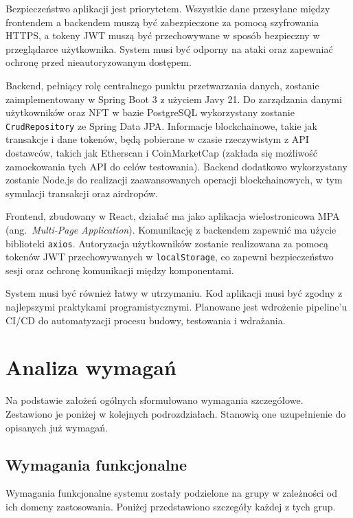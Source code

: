 Bezpieczeństwo aplikacji jest priorytetem. Wszystkie dane przesyłane między frontendem a backendem muszą być zabezpieczone za pomocą szyfrowania HTTPS, a tokeny JWT muszą być przechowywane w sposób bezpieczny w przeglądarce użytkownika. System musi być odporny na ataki oraz zapewniać ochronę przed nieautoryzowanym dostępem.

Backend, pełniący rolę centralnego punktu przetwarzania danych, zostanie zaimplementowany w Spring Boot 3 z użyciem Javy 21. Do zarządzania danymi użytkowników oraz NFT w bazie PostgreSQL wykorzystany zostanie \texttt{CrudRepository} ze Spring Data JPA. Informacje blockchainowe, takie jak transakcje i dane tokenów, będą pobierane w czasie rzeczywistym z API dostawców, takich jak Etherscan i CoinMarketCap (zakłada się możliwość zamockowania tych API do celów testowania). Backend dodatkowo wykorzystany zostanie Node.js do realizacji zaawansowanych operacji blockchainowych, w tym symulacji transakcji oraz airdropów.

Frontend, zbudowany w React, działać ma jako aplikacja wielostronicowa MPA (ang.~\emph{Multi-Page Application}). Komunikację z backendem zapewnić ma użycie biblioteki \texttt{axios}. Autoryzacja użytkowników zostanie realizowana za pomocą tokenów JWT przechowywanych w \texttt{localStorage}, co zapewni bezpieczeństwo sesji oraz ochronę komunikacji między komponentami.

System musi być również łatwy w utrzymaniu. Kod aplikacji musi być zgodny z najlepszymi praktykami programistycznymi. Planowane jest wdrożenie pipeline’u CI/CD do automatyzacji procesu budowy, testowania i wdrażania.




\section{Analiza wymagań}
Na podstawie założeń ogólnych sformułowano wymagania szczegółowe. Zestawiono je poniżej w kolejnych podrozdziałach. Stanowią one uzupełnienie do opisanych już wymagań. 
\subsection{Wymagania funkcjonalne}
Wymagania funkcjonalne systemu zostały podzielone na grupy w zależności od ich domeny zastosowania. Poniżej przedstawiono szczegóły każdej z tych grup.

